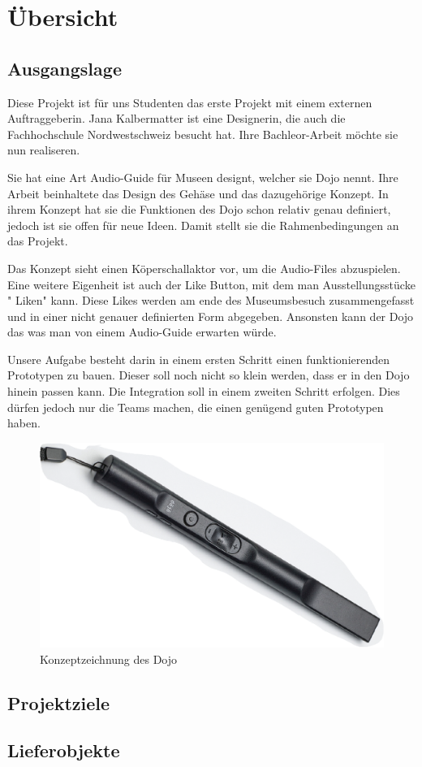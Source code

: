 \section{Übersicht} 

\subsection{Ausgangslage}
Diese Projekt ist für uns Studenten das erste Projekt mit einem externen Auftraggeberin. Jana Kalbermatter ist eine Designerin, die auch die Fachhochschule Nordwestschweiz besucht hat. Ihre Bachleor-Arbeit möchte sie nun realiseren.

Sie hat eine Art Audio-Guide für Museen designt, welcher sie Dojo nennt. Ihre Arbeit beinhaltete das Design des Gehäse und das dazugehörige Konzept. In ihrem Konzept hat sie die Funktionen des Dojo schon relativ genau definiert, jedoch ist sie offen für neue Ideen. Damit stellt sie die Rahmenbedingungen an das Projekt.

Das Konzept sieht einen Köperschallaktor vor, um die Audio-Files abzuspielen. Eine weitere Eigenheit ist auch der Like Button, mit dem man Ausstellungsstücke " Liken" kann. Diese Likes werden am ende des Museumsbesuch zusammengefasst und in einer nicht genauer definierten Form abgegeben. Ansonsten kann der Dojo das was man von einem Audio-Guide erwarten würde.

Unsere Aufgabe besteht darin in einem ersten Schritt einen funktionierenden Prototypen zu bauen. Dieser soll noch nicht so klein werden, dass er in den Dojo hinein passen kann. Die Integration soll in einem zweiten Schritt erfolgen. Dies dürfen jedoch nur die Teams machen, die einen genügend guten Prototypen haben.

\begin{figure}[H]
\begin{center}
	\includegraphics[width=160mm]{data/Ausgangslage_Dojo.png}
	\caption{Konzeptzeichnung des Dojo} %
	\label{fig:first_layer}
\end{center}
\end{figure}

\pagebreak

\subsection{Projektziele}

\subsection{Lieferobjekte}